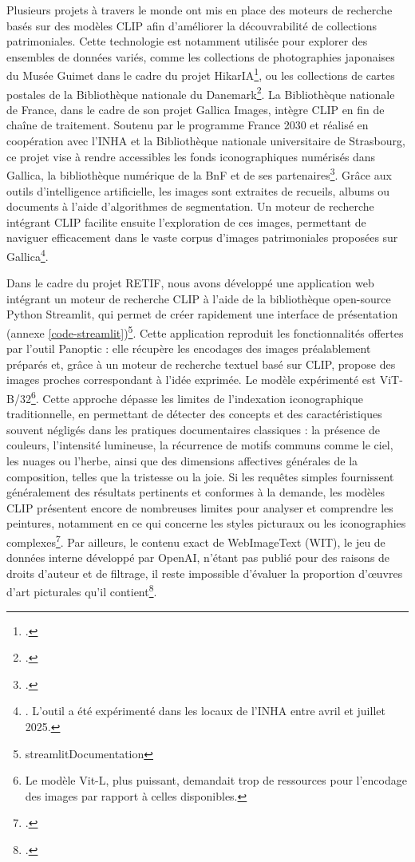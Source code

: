 Plusieurs projets à travers le monde ont mis en place des moteurs de recherche basés sur des modèles CLIP afin d’améliorer la découvrabilité de collections patrimoniales. Cette technologie est notamment utilisée pour explorer des ensembles de données variés, comme les collections de photographies japonaises du Musée Guimet dans le cadre du projet HikarIA\footcite{HikarIA}, ou les collections de cartes postales de la Bibliothèque nationale du Danemark\footcite{haffendenUnearthingForgottenImages2023}. La Bibliothèque nationale de France, dans le cadre de son projet Gallica Images, intègre CLIP en fin de chaîne de traitement. Soutenu par le programme France 2030 et réalisé en coopération avec l’INHA et la Bibliothèque nationale universitaire de Strasbourg, ce projet vise à rendre accessibles les fonds iconographiques numérisés dans Gallica, la bibliothèque numérique de la BnF et de ses partenaires\footcite{bibliothequenationaledefranceProjetsIntelligenceArtificielle}. Grâce aux outils d’intelligence artificielle, les images sont extraites de recueils, albums ou documents à l’aide d’algorithmes de segmentation. Un moteur de recherche intégrant CLIP facilite ensuite l’exploration de ces images, permettant de naviguer efficacement dans le vaste corpus d’images patrimoniales proposées sur Gallica\footnote{\cite{adamovaProjetGallicaImages2024}. L’outil a été expérimenté dans les locaux de l’INHA entre avril et juillet 2025.}.

Dans le cadre du projet RETIF, nous avons développé une application web intégrant un moteur de recherche CLIP à l’aide de la bibliothèque open-source Python Streamlit, qui permet de créer rapidement une interface de présentation (annexe \ref{code-streamlit})\footnote{streamlitDocumentation}. Cette application reproduit les fonctionnalités offertes par l’outil Panoptic : elle récupère les encodages des images préalablement préparés et, grâce à un moteur de recherche textuel basé sur CLIP, propose des images proches correspondant à l’idée exprimée. Le modèle expérimenté est ViT-B/32\footnote{Le modèle Vit-L, plus puissant, demandait trop de ressources pour l’encodage des images par rapport à celles disponibles.}. Cette approche dépasse les limites de l’indexation iconographique traditionnelle, en permettant de détecter des concepts et des caractéristiques souvent négligés dans les pratiques documentaires classiques : la présence de couleurs, l’intensité lumineuse, la récurrence de motifs communs comme le ciel, les nuages ou l’herbe, ainsi que des dimensions affectives générales de la composition, telles que la tristesse ou la joie. Si les requêtes simples fournissent généralement des résultats pertinents et conformes à la demande, les modèles CLIP présentent encore de nombreuses limites pour analyser et comprendre les peintures, notamment en ce qui concerne les styles picturaux ou les iconographies complexes\footcite{aspertiDoesCLIPPerceive2025}. Par ailleurs, le contenu exact de WebImageText (WIT), le jeu de données interne développé par OpenAI, n’étant pas publié pour des raisons de droits d’auteur et de filtrage, il reste impossible d’évaluer la proportion d’œuvres d’art picturales qu’il contient\footcite[p. 4-5]{radfordLearningTransferableVisual2021}.

